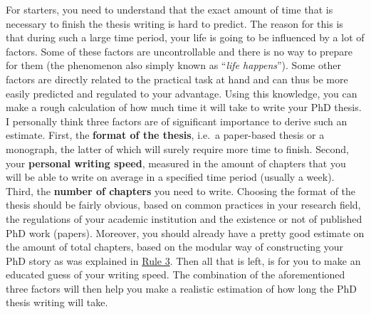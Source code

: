 \documentclass[
  12pt,
  oneside]{book}
\begin{document}
For starters, you need to understand that the exact amount of time that is necessary to finish the thesis writing is hard to predict.
The reason for this is that during such a large time period, your life is going to be influenced by a lot of factors.
Some of these factors are uncontrollable and there is no way to prepare for them (the phenomenon also simply known as ``\emph{life happens}'').
Some other factors are directly related to the practical task at hand and can thus be more easily predicted and regulated to your advantage.
Using this knowledge, you can make a rough calculation of how much time it will take to write your PhD thesis.
I personally think three factors are of significant importance to derive such an estimate.
First, the \textbf{format of the thesis}, i.e.~a paper-based thesis or a monograph, the latter of which will surely require more time to finish.
Second, your \textbf{personal writing speed}, measured in the amount of chapters that you will be able to write on average in a specified time period (usually a week).
Third, the \textbf{number of chapters} you need to write.
Choosing the format of the thesis should be fairly obvious, based on common practices in your research field, the regulations of your academic institution and the existence or not of published PhD work (papers).
Moreover, you should already have a pretty good estimate on the amount of total chapters, based on the modular way of constructing your PhD story as was explained in \protect\hyperlink{rule3}{Rule 3}.
Then all that is left, is for you to make an educated guess of your writing speed.
The combination of the aforementioned three factors will then help you make a realistic estimation of how long the PhD thesis writing will take.
\end{document}
